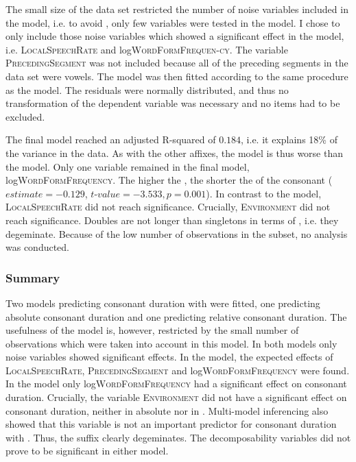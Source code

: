 The small size of the data set restricted the number of noise variables included in the model, i.e. to avoid , only few variables were tested in the model. I chose to only include those noise variables which showed a significant effect in the  model, i.e. \textsc{LocalSpeechRate} and log\textsc{WordFormFrequen-cy}. The variable \textsc{PrecedingSegment} was not included because all of the preceding segments in the data set were vowels. The model was then fitted according to the same procedure as the  model. The residuals were normally distributed, and thus no transformation of the dependent variable was necessary and no items had to be excluded.

The final model reached an adjusted R-squared of $0.184$, i.e. it explains 18\% of the variance in the data. As with the other affixes, the  model is thus worse than the  model. Only one variable remained in the final model, log\textsc{WordFormFrequency}. The higher the , the shorter the  of the consonant ($estimate= -0.129$, $t$-$value=-3.533, p=0.001$). In contrast to the  model, \textsc{LocalSpeechRate} did not reach significance. Crucially, \textsc{Environment} did not reach significance. Doubles are not longer than singletons in terms of , i.e. they degeminate.
Because of the low number of observations in the subset, no  analysis was conducted.

\subsubsection{Summary}
Two models predicting consonant duration with  were fitted, one predicting absolute consonant duration and one predicting relative consonant duration. The usefulness of the  model is, however,  restricted by the small number of observations which were taken into account in this model. In both models only noise variables showed significant effects. 
In the  model, the expected effects of \textsc{LocalSpeechRate}, \textsc{PrecedingSegment} and log\textsc{WordFormFrequency} were found. In the  model only log\textsc{WordFormFrequency} had a significant effect on consonant duration.
Crucially, the variable \textsc{Environment} did not have a significant effect on consonant duration, neither in absolute nor in . Multi-model inferencing also showed that this variable is not an important predictor for consonant duration with . Thus, the suffix  clearly degeminates.
The decomposability variables did not prove to be significant in either model.




